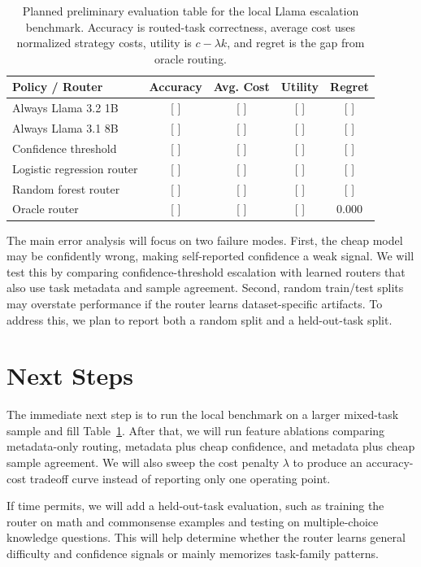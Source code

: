 \documentclass{article}
\begin{document}
\begin{table}[h]
\centering
\small
\begin{tabular}{lcccc}
\toprule
Policy / Router & Accuracy & Avg. Cost & Utility & Regret \\
\midrule
Always Llama 3.2 1B & [ ] & [ ] & [ ] & [ ] \\
Always Llama 3.1 8B & [ ] & [ ] & [ ] & [ ] \\
Confidence threshold & [ ] & [ ] & [ ] & [ ] \\
Logistic regression router & [ ] & [ ] & [ ] & [ ] \\
Random forest router & [ ] & [ ] & [ ] & [ ] \\
Oracle router & [ ] & [ ] & [ ] & 0.000 \\
\bottomrule
\end{tabular}
\caption{Planned preliminary evaluation table for the local Llama escalation benchmark. Accuracy is routed-task correctness, average cost uses normalized strategy costs, utility is $c-\lambda k$, and regret is the gap from oracle routing.}
\label{tab:prelim}
\end{table}

The main error analysis will focus on two failure modes. First, the cheap model may be confidently wrong, making self-reported confidence a weak signal. We will test this by comparing confidence-threshold escalation with learned routers that also use task metadata and sample agreement. Second, random train/test splits may overstate performance if the router learns dataset-specific artifacts. To address this, we plan to report both a random split and a held-out-task split.

\section{Next Steps}

The immediate next step is to run the local benchmark on a larger mixed-task sample and fill Table~\ref{tab:prelim}. After that, we will run feature ablations comparing metadata-only routing, metadata plus cheap confidence, and metadata plus cheap sample agreement. We will also sweep the cost penalty $\lambda$ to produce an accuracy-cost tradeoff curve instead of reporting only one operating point.

If time permits, we will add a held-out-task evaluation, such as training the router on math and commonsense examples and testing on multiple-choice knowledge questions. This will help determine whether the router learns general difficulty and confidence signals or mainly memorizes task-family patterns.
\end{document}
